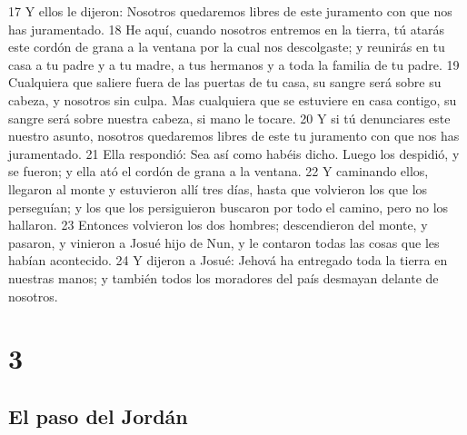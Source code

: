 17 Y ellos le dijeron: Nosotros quedaremos libres de este juramento con que nos has juramentado.
18 He aquí, cuando nosotros entremos en la tierra, tú atarás este cordón de grana a la ventana por la cual nos descolgaste; y reunirás en tu casa a tu padre y a tu madre, a tus hermanos y a toda la familia de tu padre.
19 Cualquiera que saliere fuera de las puertas de tu casa, su sangre será sobre su cabeza, y nosotros sin culpa. Mas cualquiera que se estuviere en casa contigo, su sangre será sobre nuestra cabeza, si mano le tocare.
20 Y si tú denunciares este nuestro asunto, nosotros quedaremos libres de este tu juramento con que nos has juramentado.
21 Ella respondió: Sea así como habéis dicho. Luego los despidió, y se fueron; y ella ató el cordón de grana a la ventana.
22 Y caminando ellos, llegaron al monte y estuvieron allí tres días, hasta que volvieron los que los perseguían; y los que los persiguieron buscaron por todo el camino, pero no los hallaron.
23 Entonces volvieron los dos hombres; descendieron del monte, y pasaron, y vinieron a Josué hijo de Nun, y le contaron todas las cosas que les habían acontecido.
24 Y dijeron a Josué: Jehová ha entregado toda la tierra en nuestras manos; y también todos los moradores del país desmayan delante de nosotros.

\chapter{3}

\section*{El paso del Jordán}


